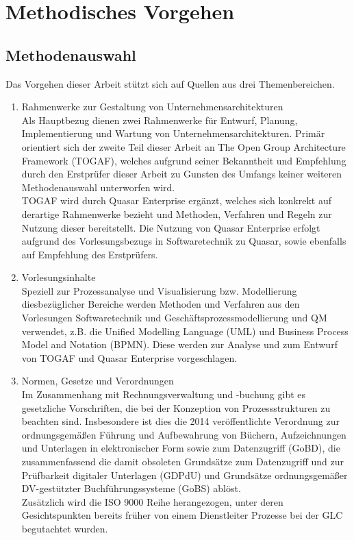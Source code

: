 \section{Methodisches Vorgehen}
\subsection{Methodenauswahl}

Das Vorgehen dieser Arbeit stützt sich auf Quellen aus drei Themenbereichen.

\begin{enumerate}



\item{Rahmenwerke zur Gestaltung von Unternehmensarchitekturen}
\\ Als Hauptbezug dienen zwei Rahmenwerke für Entwurf, Planung, Implementierung und Wartung von Unternehmensarchitekturen. 
Primär orientiert sich der zweite Teil dieser Arbeit an The Open Group Architecture Framework (TOGAF), welches aufgrund seiner Bekanntheit und Empfehlung durch den Erstprüfer dieser Arbeit zu Gunsten des Umfangs keiner weiteren Methodenauswahl unterworfen wird. \\
TOGAF wird durch Quasar Enterprise ergänzt, welches sich konkrekt auf derartige Rahmenwerke bezieht und Methoden, Verfahren und Regeln zur Nutzung dieser bereitstellt. 
Die Nutzung von Quasar Enterprise erfolgt aufgrund des Vorlesungsbezugs in Softwaretechnik zu Quasar, sowie ebenfalls auf Empfehlung des Erstprüfers.

\item{Vorlesungsinhalte}
\\ Speziell zur Prozessanalyse und Visualisierung bzw. Modellierung diesbezüglicher Bereiche werden Methoden und Verfahren aus den Vorlesungen Softwaretechnik und Geschäftsprozessmodellierung und QM verwendet, z.B. die Unified Modelling Language (UML) und Business Process Model and Notation (BPMN). 
Diese werden zur Analyse und zum Entwurf von TOGAF und Quasar Enterprise vorgeschlagen.

\item{Normen, Gesetze und Verordnungen}
\\ Im Zusammenhang mit Rechnungsverwaltung und -buchung gibt es gesetzliche Vorschriften, die bei der Konzeption von Prozessstrukturen zu beachten sind.
Insbesondere ist dies die 2014 veröffentlichte Verordnung zur ordnungsgemäßen Führung und Aufbewahrung von Büchern, Aufzeichnungen und Unterlagen in elektronischer Form sowie zum Datenzugriff (GoBD), die zusammenfassend die damit obsoleten Grundsätze zum Datenzugriff und zur Prüfbarkeit digitaler Unterlagen (GDPdU) und Grundsätze ordnungsgemäßer DV-gestützter Buchführungssysteme (GoBS) ablöst.\\
Zusätzlich wird die ISO 9000 Reihe herangezogen, unter deren Gesichtspunkten bereits früher von einem Dienstleiter Prozesse bei der GLC begutachtet wurden.
\end{enumerate}

